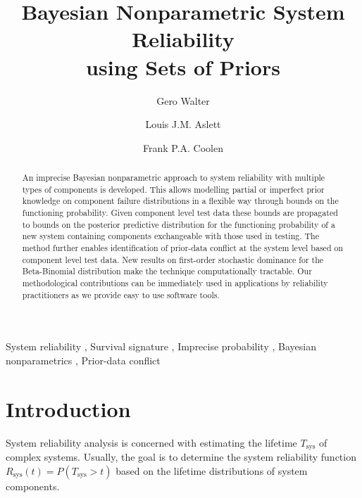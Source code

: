 \documentclass[12pt, a4paper]{elsarticle}
\newcommand{\Rsys}{R_\text{sys}}
\def\Tsys{T_\text{sys}}
\begin{document}

\begin{frontmatter}
\title{Bayesian Nonparametric System Reliability\\ using Sets of Priors}

\author[ein]{Gero Walter}
\author[oxf]{Louis J.M. Aslett}
\author[dur]{Frank P.A. Coolen}

\address[ein]{School of Industrial Engineering, Eindhoven University of Technology, Eindhoven, NL}
\address[oxf]{Department of Statistics, University of Oxford, Oxford, UK}
\address[dur]{Department of Mathematical Sciences, Durham University, Durham, UK}

\begin{abstract}
An imprecise Bayesian nonparametric approach
to system reliability with multiple types of components
is developed.
This allows modelling partial or imperfect prior knowledge on component failure distributions
in a flexible way through bounds on the functioning probability.
Given component level test data these bounds are propagated 
to bounds on the posterior predictive distribution for the functioning probability of
a new system containing components exchangeable with those 
used in testing.  The method further enables identification 
of prior-data conflict at the system level based on component level test data.
%
New results on first-order stochastic dominance for the Beta-Binomial distribution
make the technique computationally tractable.
Our methodological contributions can be immediately used in
applications by reliability practitioners
as we provide easy to use software tools.
\end{abstract}

\begin{keyword}
System reliability \sep
Survival signature \sep
Imprecise probability \sep
Bayesian nonparametrics \sep
Prior-data conflict
\end{keyword}
\end{frontmatter}



\section{Introduction}

System reliability analysis is concerned with
estimating the lifetime $\Tsys$ of complex systems.
Usually, the goal is to determine the system reliability function $\Rsys(t) = P(\Tsys > t)$
based on the lifetime distributions of system components.
\end{document}
